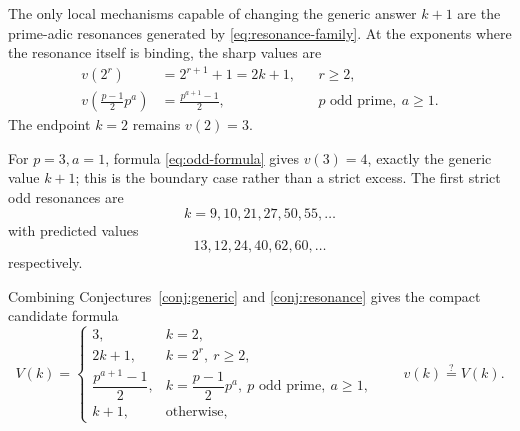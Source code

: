 \documentclass[../../Axiomathic.tex]{subfiles}
\begin{document}
\begin{conj}\label{conj:resonance}
The only local mechanisms capable of changing the generic answer $k+1$ are the prime-adic resonances generated by \eqref{eq:resonance-family}.  At the exponents where the resonance itself is binding, the sharp values are
\begin{align}
  v(2^r)&=2^{r+1}+1=2k+1,
       &&r\ge2, \label{eq:two-formula}\\
  v\!\left(\frac{p-1}{2}p^a\right)
       &=\frac{p^{a+1}-1}{2},
       &&p\text{ odd prime},\ a\ge1. \label{eq:odd-formula}
\end{align}
The endpoint $k=2$ remains $v(2)=3$.
\end{conj}

For $p=3,a=1$, formula \eqref{eq:odd-formula} gives $v(3)=4$, exactly the generic value $k+1$; this is the boundary case rather than a strict excess.  The first strict odd resonances are
\[
  k=9,10,21,27,50,55,\ldots
\]
with predicted values
\[
  13,12,24,40,62,60,\ldots
\]
respectively.

Combining Conjectures~\ref{conj:generic} and \ref{conj:resonance} gives the compact candidate formula
\begin{equation}\label{eq:candidate-formula}
V(k)=
\begin{cases}
3,&k=2,\\
2k+1,&k=2^r,\ r\ge2,\\[1mm]
\dfrac{p^{a+1}-1}{2},&k=\dfrac{p-1}{2}p^a,\ p\text{ odd prime},\ a\ge1,\\[2mm]
k+1,&\text{otherwise},
\end{cases}
\qquad
\boxed{v(k)\stackrel?=V(k).}
\end{equation}
\end{document}
